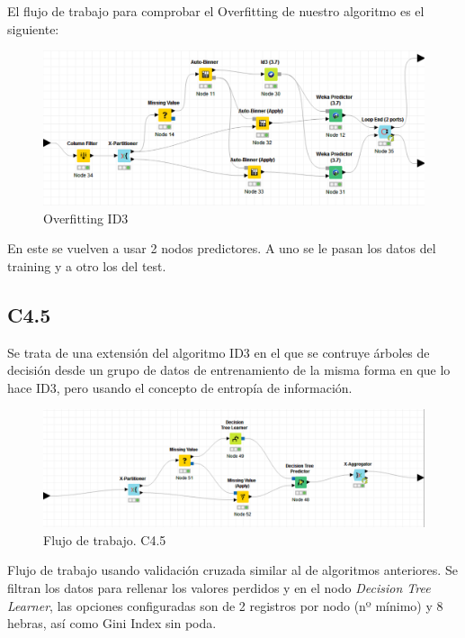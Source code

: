 	\newpage
	
	El flujo de trabajo para comprobar el Overfitting de nuestro algoritmo es el siguiente:
	
	\begin{figure}[H]
		\centering
		\includegraphics[width=1\textwidth]{img/id3over.png}
		\caption{Overfitting ID3}
	\end{figure}

	En este se vuelven a usar 2 nodos predictores. A uno se le pasan los datos del training y a otro los del test.
	
	
	\subsection{C4.5}
	\hspace{1cm} Se trata de una extensión del algoritmo ID3 en el que se contruye árboles de decisión desde un grupo de datos de entrenamiento de la misma forma en que lo hace ID3, pero usando el concepto de entropía de información.
	
	
	\begin{figure}[H]
		\centering
		\includegraphics[width=1\textwidth]{img/flujo4.png}
		\caption{Flujo de trabajo. C4.5}
	\end{figure}
	
	
	Flujo de trabajo usando validación cruzada similar al de algoritmos anteriores. Se filtran los datos para rellenar los valores perdidos y en el nodo \textit{Decision Tree Learner}, las opciones configuradas son de 2 registros por nodo (nº mínimo) y 8 hebras, así como Gini Index sin poda.
	

